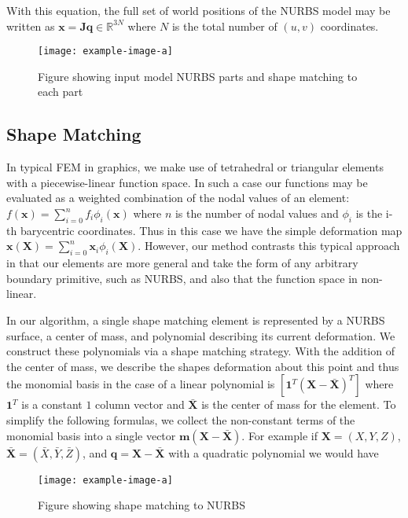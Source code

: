 With this equation, the full set of world positions of the NURBS model may be written as $\mathbf{x} = \mathbf{J}\mathbf{q} \in \mathbb{R}^{3N}$ where $N$ is the total number of $(u,v)$ coordinates.


\begin{figure}
    \texttt{[image: example-image-a]}
    \caption{Figure showing input model NURBS parts and shape matching to each part}
    \label{fig:shapematching}
\end{figure}

\subsection{Shape Matching}
In typical FEM in graphics, we make use of tetrahedral or triangular elements with a piecewise-linear function space. In such a case our functions may be evaluated as a weighted combination of the nodal values of an element: $f(\mathbf x)=\sum_{i=0}^n f_i \phi_i(\mathbf{x})$ where $n$ is the number of nodal values and $\phi_i$ is the i-th barycentric coordinates. Thus in this case we have the simple deformation map $\mathbf{x(X)} = \sum_{i=0}^n \mathbf{x}_i \phi_i(\mathbf{X})$. However, our method contrasts this typical approach in that our elements are more general and take the form of any arbitrary boundary primitive, such as NURBS, and also that the function space in non-linear. 

In our algorithm, a single shape matching element is represented by a NURBS surface, a center of mass, and polynomial describing its current deformation. We construct these polynomials via a shape matching strategy. With the addition of the center of mass, we describe the shapes deformation about this point and thus the monomial basis in the case of a linear polynomial is $\left[ \mathbf 1^T (\mathbf{X - \bar{X}})^T \right]$ where $\mathbf 1^T$ is a constant $1$ column vector and $\mathbf{\bar{X}}$ is the center of mass for the element. To simplify the following formulas, we collect the non-constant terms of the monomial basis into a single vector $\mathbf{m}(\mathbf{X}-\mathbf{\bar{X}})$. For example if $\mathbf{X} = (X,Y,Z)$, $\mathbf{\bar{X}} = (\bar X, \bar Y, \bar Z)$, and $\mathbf{q}=\mathbf{X}-\mathbf{\bar{X}}$ with a quadratic polynomial we would have

\begin{figure}
    \texttt{[image: example-image-a]}
    \caption{Figure showing shape matching to NURBS}
    \label{fig:shapematching}
\end{figure}

